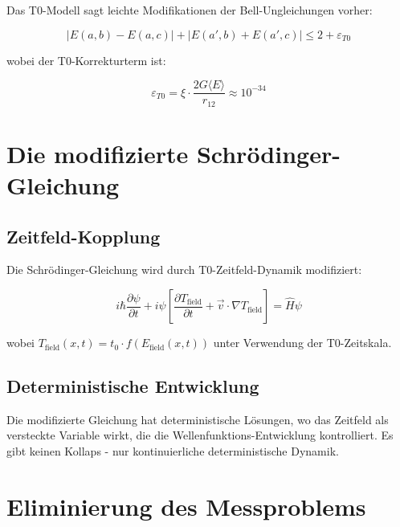 \documentclass[12pt,a4paper]{report}
\begin{document}
	Das T0-Modell sagt leichte Modifikationen der Bell-Ungleichungen vorher:
	
	\begin{equation}
		|E(a,b) - E(a,c)| + |E(a',b) + E(a',c)| \leq 2 + \varepsilon_{T0}
	\end{equation}
	
	wobei der T0-Korrekturterm ist:
	
	\begin{equation}
		\varepsilon_{T0} = \xi \cdot \frac{2G\langle E \rangle}{r_{12}} \approx 10^{-34}
	\end{equation}
	
	\section{Die modifizierte Schrödinger-Gleichung}
	\label{sec:modified_schrodinger}
	
	\subsection{Zeitfeld-Kopplung}
	\label{subsec:time_field_coupling}
	
	Die Schrödinger-Gleichung wird durch T0-Zeitfeld-Dynamik modifiziert:
	
	\begin{equation}
		\boxed{i \hbar \frac{\partial\psi}{\partial t} + i\psi\left[\frac{\partial T_{\text{field}}}{\partial t} + \vec{v} \cdot \nabla T_{\text{field}}\right] = \hat{H}\psi}
		\label{eq:modified_schrodinger}
	\end{equation}
	
	wobei $T_{\text{field}}(x,t) = t_0 \cdot f(E_{\text{field}}(x,t))$ unter Verwendung der T0-Zeitskala.
	
	\subsection{Deterministische Entwicklung}
	\label{subsec:deterministic_evolution}
	
	Die modifizierte Gleichung hat deterministische Lösungen, wo das Zeitfeld als versteckte Variable wirkt, die die Wellenfunktions-Entwicklung kontrolliert. Es gibt keinen Kollaps - nur kontinuierliche deterministische Dynamik.
	
	\section{Eliminierung des Messproblems}
	\label{sec:measurement_problem}
	
\end{document}
